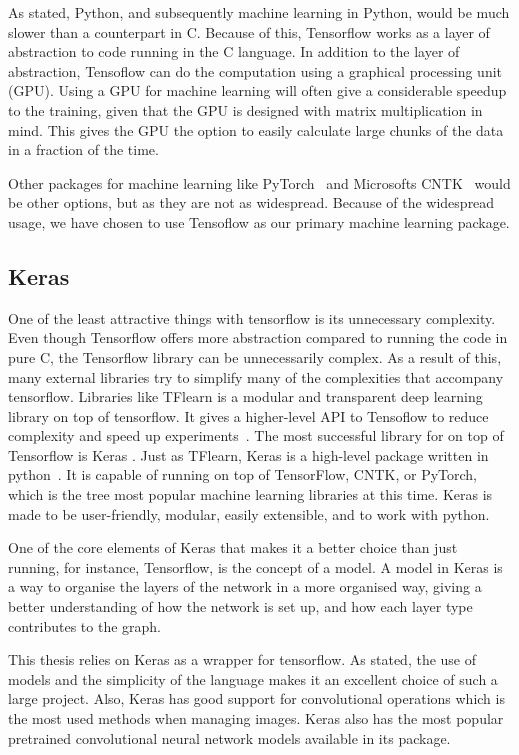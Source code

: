 As stated, Python, and subsequently machine learning in Python, would be much slower than a counterpart in C. Because of this, Tensorflow works as a layer of abstraction to code running in the C language. 
In addition to the layer of abstraction, Tensoflow can do the computation using a graphical processing unit (GPU). Using a GPU for machine learning will often give a considerable speedup to the training, given that the GPU is designed with matrix multiplication in mind. This gives the GPU the option to easily calculate large chunks of the data in a fraction of the time.

Other packages for machine learning like PyTorch~\cite{paszke2017automatic} and Microsofts CNTK~\cite{Seide:2016:CMO:2939672.2945397} would be other options, but as they are not as widespread. Because of the widespread usage, we have chosen to use Tensoflow as our primary machine learning package.



\subsection{Keras}
One of the least attractive things with tensorflow is its unnecessary complexity.  Even though Tensorflow offers more abstraction compared to running the code in pure C, the Tensorflow library can be unnecessarily complex. As a result of this, many external libraries try to simplify many of the complexities that accompany tensorflow. 
Libraries like TFlearn is a modular and transparent deep learning library on top of tensorflow. It gives a higher-level API to Tensoflow to reduce complexity and speed up experiments~\cite{tflearn2016}.
The most successful library for on top of Tensorflow is Keras . 
Just as TFlearn, Keras is a high-level package written in python~\cite{chollet2015keras}. It is capable of running on top of TensorFlow, CNTK, or PyTorch, which is the tree most popular machine learning libraries at this time.  Keras is made to be user-friendly, modular, easily extensible, and to work with python.

One of the core elements of Keras that makes it a better choice than just running, for instance, Tensorflow, is the concept of a model. A model in Keras is a way to organise the layers of the network in a more organised way, giving a better understanding of how the network is set up, and how each layer type contributes to the graph. 

This thesis relies on Keras as a wrapper for tensorflow. As stated, the use of models and the simplicity of the language makes it an excellent choice of such a large project. Also, Keras has good support for convolutional operations which is the most used methods when managing images. Keras also has the most popular pretrained convolutional neural network models available in its package.





